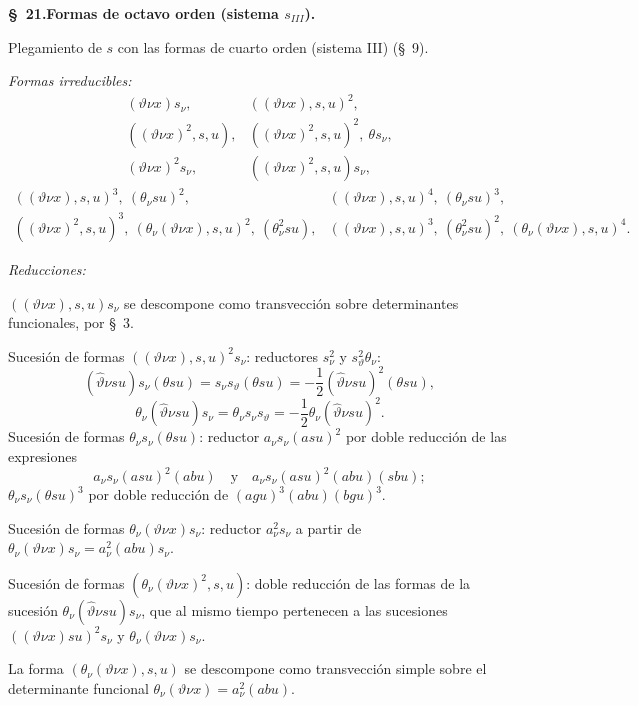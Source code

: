 \documentclass[11pt]{article}
\begin{document}
\begin{center}
\textbf{\S\ 21.\quad Formas de octavo orden (sistema $s_{III}$).}
\end{center}

Plegamiento de $s$ con las formas de cuarto orden (sistema III) (\S\ 9).

\noindent\emph{Formas irreducibles:}
\[
\begin{array}{lll}
(\vartheta\nu x)s_\nu,& ((\vartheta\nu x),s,u)^2,\\[-0.1em]
((\vartheta\nu x)^2,s,u),& ((\vartheta\nu x)^2,s,u)^2,\ \theta s_\nu,\\[-0.1em]
(\vartheta\nu x)^2s_\nu,& ((\vartheta\nu x)^2,s,u)s_\nu,
\end{array}
\]
\[
\begin{array}{lll}
((\vartheta\nu x),s,u)^3,\ (\theta_\nu su)^2,&
((\vartheta\nu x),s,u)^4,\ (\theta_\nu su)^3,\\[-0.1em]
((\vartheta\nu x)^2,s,u)^3,\ (\theta_\nu(\vartheta\nu x),s,u)^2,\ (\theta_\nu^2su),&
((\vartheta\nu x),s,u)^3,\ (\theta_\nu^2su)^2,\ (\theta_\nu(\vartheta\nu x),s,u)^4.
\end{array}
\]

\noindent\emph{Reducciones:}

$((\vartheta\nu x),s,u)s_\nu$ se descompone como transvección sobre determinantes funcionales, por \S\ 3.

Sucesión de formas $((\vartheta\nu x),s,u)^2s_\nu$: reductores $s_\nu^2$ y $s_\vartheta^2\theta_\nu$:
\[
(\widehat\vartheta\nu su)s_\nu(\theta su)=s_\nu s_\vartheta(\theta su)=-\frac12(\widehat\vartheta\nu su)^2(\theta su),
\]
\[
\theta_\nu(\widehat\vartheta\nu su)s_\nu=\theta_\nu s_\nu s_\vartheta=-\frac12\theta_\nu(\widehat\vartheta\nu su)^2.
\]
Sucesión de formas $\theta_\nu s_\nu(\theta su)$: reductor $a_\nu s_\nu(asu)^2$ por doble reducción de las expresiones
\[
a_\nu s_\nu(asu)^2(abu)\quad\text{y}\quad a_\nu s_\nu(asu)^2(abu)(sbu);
\]
$\theta_\nu s_\nu(\theta su)^3$ por doble reducción de $(agu)^3(abu)(bgu)^3$.

Sucesión de formas $\theta_\nu(\vartheta\nu x)s_\nu$: reductor $a_\nu^2s_\nu$ a partir de $\theta_\nu(\vartheta\nu x)s_\nu=a_\nu^2(abu)s_\nu$.

Sucesión de formas $(\theta_\nu(\vartheta\nu x)^2,s,u)$: doble reducción de las formas de la sucesión $\theta_\nu(\widehat\vartheta\nu su)s_\nu$, que al mismo tiempo pertenecen a las sucesiones $((\vartheta\nu x)su)^2s_\nu$ y $\theta_\nu(\vartheta\nu x)s_\nu$.

La forma $(\theta_\nu(\vartheta\nu x),s,u)$ se descompone como transvección simple sobre el determinante funcional $\theta_\nu(\vartheta\nu x)=a_\nu^2(abu)$.
\end{document}
